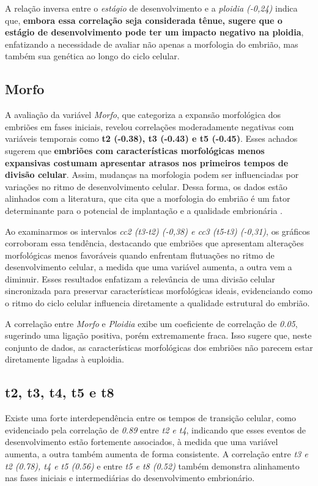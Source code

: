 A relação inversa entre o \textit{estágio} de desenvolvimento e a \textit{ploidia (-0,24)} indica que, \textbf{embora essa correlação seja considerada tênue, sugere que o estágio de desenvolvimento pode ter um impacto negativo na ploidia}, enfatizando a necessidade de avaliar não apenas a morfologia do embrião, mas também sua genética ao longo do ciclo celular. 

\subsection*{Morfo}
A avaliação da variável \textit{Morfo}, que categoriza a expansão morfológica dos embriões em fases iniciais, revelou correlações moderadamente negativas com variáveis temporais como \textbf{t2 (-0.38), t3 (-0.43) e t5 (-0.45)}. Esses achados sugerem que \textbf{embriões com características morfológicas menos expansivas costumam apresentar atrasos nos primeiros tempos de divisão celular}. Assim, mudanças na morfologia podem ser influenciadas por variações no ritmo de desenvolvimento celular. Dessa forma, os dados estão alinhados com a literatura, que cita que a morfologia do embrião é um fator determinante para o potencial de implantação e a qualidade embrionária .

Ao examinarmos os intervalos \textit{cc2 (t3-t2) (-0,38) e cc3 (t5-t3) (-0,31)}, os gráficos corroboram essa tendência, destacando que embriões que apresentam alterações morfológicas menos favoráveis quando enfrentam flutuações no ritmo de desenvolvimento celular, a medida que uma variável aumenta, a outra vem a diminuir. Esses resultados enfatizam a relevância de uma divisão celular sincronizada para preservar características morfológicas ideais, evidenciando como o ritmo do ciclo celular influencia diretamente a qualidade estrutural do embrião.

A correlação entre \textit{Morfo} e \textit{Ploidia} exibe um coeficiente de correlação de \textit{0.05}, sugerindo uma ligação positiva, porém extremamente fraca. Isso sugere que, neste conjunto de dados, as características morfológicas dos embriões não parecem estar diretamente ligadas à euploidia. 

\subsection*{t2, t3, t4, t5 e t8}
Existe uma forte interdependência entre os tempos de transição celular, como evidenciado pela correlação de \textit{0.89} entre \textit{t2 e t4}, indicando que esses eventos de desenvolvimento estão fortemente associados, à medida que uma variável aumenta, a outra também aumenta de forma consistente. A correlação entre \textit{t3 e t2 (0.78), t4 e t5 (0.56)} e entre \textit{t5 e t8 (0.52)} também demonstra alinhamento nas fases iniciais e intermediárias do desenvolvimento embrionário. 

